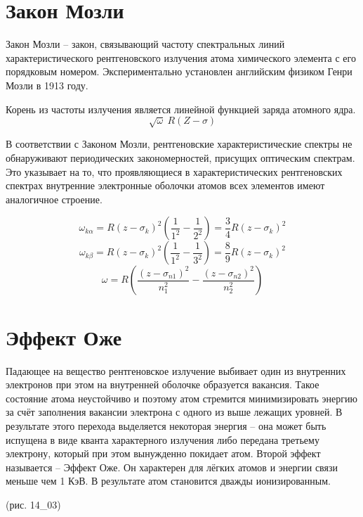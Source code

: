 \section{Закон Мозли}
Закон Мозли -- закон, связывающий частоту спектральных линий 
характеристического рентгеновского излучения атома химического 
элемента с его порядковым номером. Экспериментально установлен 
английским физиком Генри Мозли в 1913 году.

Корень из частоты излучения является линейной функцией заряда атомного ядра.
\[ \sqrt\omega ~ R(Z-\sigma) \]

В соответствии с Законом Мозли, рентгеновские характеристические 
спектры не обнаруживают периодических закономерностей, присущих 
оптическим спектрам. Это указывает на то, что проявляющиеся в 
характеристических рентгеновских спектрах внутренние электронные оболочки 
атомов всех элементов имеют аналогичное строение.

\[
	\omega_{k\alpha} = R(z-\sigma_k)^2(\frac{1}{1^2} - \frac{1}{2^2}) =
	\frac{3}{4}R(z-\sigma_k)^2
\]
\[
	\omega_{k\beta} = R(z-\sigma_k)^2(\frac{1}{1^2} - \frac{1}{3^2}) = 
	\frac{8}{9}R(z-\sigma_k)^2
\]
\[ 
	\omega = R\left( \frac{(z-\sigma_{n1})^2}{n^2_1} -
	\frac{(z-\sigma_{n2})^2}{n^2_2}\right)
\]

\section{Эффект Оже}
Падающее на вещество рентгеновское излучение выбивает один из внутренних 
электронов при этом на внутренней оболочке образуется вакансия. Такое 
состояние атома неустойчиво и поэтому атом стремится минимизировать энергию 
за счёт заполнения вакансии электрона с одного из выше лежащих уровней. В 
результате этого перехода выделяется некоторая энергия -- она может быть 
испущена в виде кванта характерного излучения либо передана третьему электрону, 
который при этом вынужденно покидает атом. Второй эффект называется -- 
Эффект Оже. Он характерен для лёгких атомов и энергии связи меньше чем 1 КэВ. 
В результате атом становится дважды ионизированным. 

(рис. 14\_03)

\newpage
